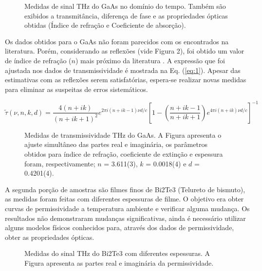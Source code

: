 \documentclass[a4paper,12pt,oneside]{article}
\begin{document}
\begin{figure}[ht]
  \centering
  \caption{Medidas de sinal THz do GaAs no domínio do tempo. Também são exibidos a transmitância, diferença de fase e as propriedades ópticas obtidas (Índice de refração e Coeficiente de absorção). }
  \label{fig:1}
\end{figure}

Os dados obtidos para o GaAs não foram parecidos com os encontrados na literatura. Porém, considerando as reflexões (vide Figura 2), foi obtido um valor de índice de refração ($n$) mais próximo da literatura \cite{Nicolas2023, Grischkowsky1990}. A expressão que foi ajustada nos dados de transmissividade é mostrada na Eq. (\ref{eq:1}). Apesar das estimativas com as reflexões serem satisfatórias, espera-se realizar novas medidas para eliminar as suspeitas de erros sistemáticos.

\begin{equation}
    \widetilde{\tau}(\nu, n, k, d) = \frac{4(n+ik)}{(n+ik+1)^{2}} e^{2\pi i(n+ik-1)\nu d/c} \left[ 1 - \left(\frac{n+ik-1}{n+ik+1}\right) e^{4\pi i(n+ik)\nu d/c} \right]^{-1}
    \label{eq:1}
\end{equation}

\begin{figure}[ht]
  \centering
  \caption{Medidas de transmissividade THz do GaAs. A Figura apresenta o ajuste simultâneo das partes real e imaginária, os parâmetros obtidos para índice de refração, coeficiente de extinção e espessura foram, respectivamente; $n$ = 3.611(3), $k$ = 0.0018(4) e $d$ = 0.4201(4).}
  \label{fig:2}
\end{figure}

A segunda porção de amostras são filmes finos de Bi2Te3 (Telureto de bismuto), as medidas foram feitas com diferentes espessuras de filme. O objetivo era obter curvas de permissividade a temperatura ambiente e verificar alguma mudança. Os resultados não demonstraram mudanças significativas, ainda é necessário utilizar alguns modelos físicos conhecidos para, através dos dados de permissividade, obter as propriedades ópticas. 

\begin{figure}[ht]
  \centering
  \caption{Medidas do sinal THz do Bi2Te3 com diferentes espessuras. A Figura apresenta as partes real e imaginária da permissividade.}
  \label{fig:3}
\end{figure}
\end{document}
